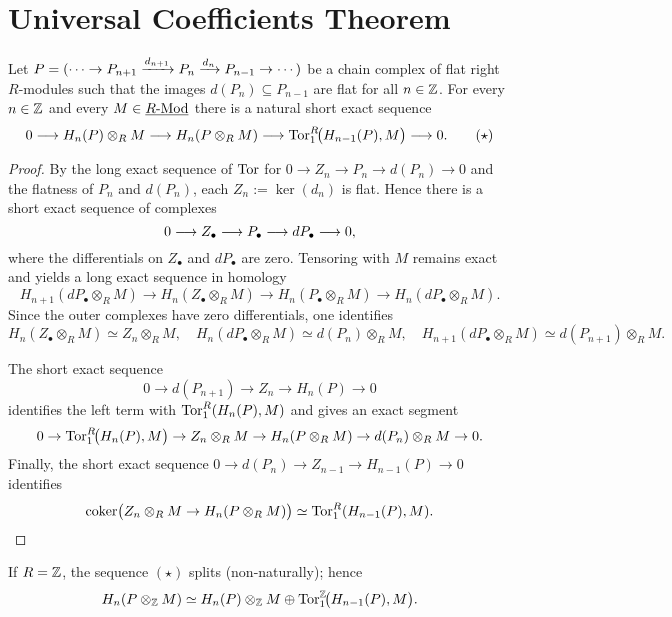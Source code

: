 \section{Universal Coefficients Theorem}

\begin{theorem*}
	Let \( P=(\dotsm \to P_{n+1} \xrightarrow{d_{n+1}} P_n \xrightarrow{d_n} P_{n-1}\to\dotsm) \) be a chain complex of flat right \( R \)-modules such that the images \( d(P_n)\subseteq P_{n-1} \) are flat for all \( n\in\mathbb{Z} \). For every \( n\in\mathbb{Z} \) and every \( M\in \underline{R\text{-}\mathrm{Mod}} \) there is a natural short exact sequence
	\[
		0 \longrightarrow H_n(P)\otimes_R M \longrightarrow H_n(P\otimes_R M) \longrightarrow \operatorname{Tor}^{R}_1\!\bigl(H_{n-1}(P), M\bigr) \longrightarrow 0. \tag{$\star$}
	\]
\end{theorem*}
\begin{proof}
	By the long exact sequence of \( \operatorname{Tor} \) for \( 0\to Z_n \to P_n \to d(P_n) \to 0 \) and the flatness of \( P_n \) and \( d(P_n) \), each \( Z_n:=\ker(d_n) \) is flat. Hence there is a short exact sequence of complexes
	\[
		0 \longrightarrow Z_{\bullet} \longrightarrow P_{\bullet} \longrightarrow dP_{\bullet} \longrightarrow 0,
	\]
	where the differentials on \( Z_{\bullet} \) and \( dP_{\bullet} \) are zero. Tensoring with \( M \) remains exact and yields a long exact sequence in homology
	\[
		H_{n+1}(dP_{\bullet}\otimes_R M) \to H_n(Z_{\bullet}\otimes_R M) \to H_n(P_{\bullet}\otimes_R M) \to H_n(dP_{\bullet}\otimes_R M).
	\]
	Since the outer complexes have zero differentials, one identifies
	\[
		H_n(Z_{\bullet}\otimes_R M) \simeq Z_n\otimes_R M, \quad H_n(dP_{\bullet}\otimes_R M) \simeq d(P_n)\otimes_R M, \quad H_{n+1}(dP_{\bullet}\otimes_R M) \simeq d(P_{n+1})\otimes_R M.
	\]

	The short exact sequence
	\[
		0\to d(P_{n+1})\to Z_n\to H_n(P)\to 0
	\]
	identifies the left term with \( \operatorname{Tor}_1^{R}(H_n(P),M) \) and gives an exact segment
	\[
		0\to \operatorname{Tor}_1^R\!\bigl(H_n(P),M\bigr) \to Z_n\otimes_R M \to H_n(P\otimes_R M) \to d(P_n)\otimes_R M \to 0.
	\]
	Finally, the short exact sequence \( 0\to d(P_n)\to Z_{n-1}\to H_{n-1}(P)\to 0 \) identifies
	\[
		\operatorname{coker}\bigl(Z_n\otimes_R M \to H_n(P\otimes_R M)\bigr) \simeq \operatorname{Tor}_1^{R}(H_{n-1}(P),M).
	\]
\end{proof}

\begin{corollary*}
	If \( R=\mathbb{Z} \), the sequence \( (\star) \) splits (non-naturally); hence
	\[
		H_n(P\otimes_{\mathbb{Z}} M) \simeq H_n(P)\otimes_{\mathbb{Z}} M \oplus \operatorname{Tor}^{\mathbb{Z}}_1\!\bigl(H_{n-1}(P),M\bigr).
	\]
\end{corollary*}

